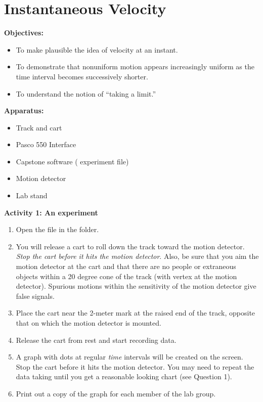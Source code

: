 \section{Instantaneous Velocity}

\makelabheader %

{\noindent \bf Objectives:} 

\begin{itemize}[nosep]
\item To make plausible the idea of velocity at an instant. 
\item To demonstrate that nonuniform motion appears increasingly uniform as the time interval becomes successively shorter. 
\item To understand the notion of ``taking a limit.''
\end{itemize}

\textbf{Apparatus:}

\begin{itemize}
\item Track and cart 
\item Pasco 550 Interface
\item Capstone software ( experiment file)
\item Motion detector
\item Lab stand
\end{itemize}
{\noindent \bf Activity 1: An experiment} \begin{enumerate}

\item Open the file  in the \filename{\coursefolder} folder.

\item You will release a cart to roll down the track toward the motion
detector. \emph{Stop the cart before it hits the motion detector}. Also, be sure
that you aim the motion detector at the cart and that there are no people or
extraneous objects within a 20 degree cone of the track (with vertex
at the motion detector). Spurious motions within the sensitivity of
the motion detector give false signals.

\item Place the cart near the 2-meter mark at the raised end of the track, opposite that on which the motion detector is mounted.

\item Release the cart from rest and start recording data.

\item A graph with dots at regular \textit{time} intervals will be created on the screen. Stop the cart before it hits the motion detector. You may need to repeat the data taking until you get a reasonable looking chart (see Question 1).

\item Print out a copy of the graph for each member of the lab group.

\end{enumerate}

